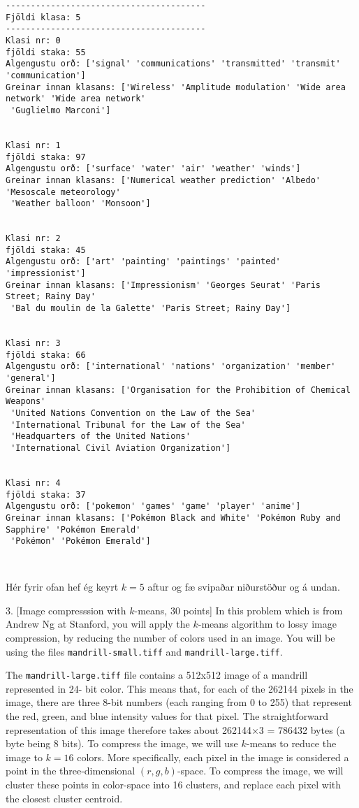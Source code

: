 \documentclass[11pt]{article}
\begin{document}
    \begin{Verbatim}[commandchars=\\\{\}]
----------------------------------------
Fjöldi klasa: 5
----------------------------------------
Klasi nr: 0
fjöldi staka: 55
Algengustu orð: ['signal' 'communications' 'transmitted' 'transmit' 'communication']
Greinar innan klasans: ['Wireless' 'Amplitude modulation' 'Wide area network' 'Wide area network'
 'Guglielmo Marconi']


Klasi nr: 1
fjöldi staka: 97
Algengustu orð: ['surface' 'water' 'air' 'weather' 'winds']
Greinar innan klasans: ['Numerical weather prediction' 'Albedo' 'Mesoscale meteorology'
 'Weather balloon' 'Monsoon']


Klasi nr: 2
fjöldi staka: 45
Algengustu orð: ['art' 'painting' 'paintings' 'painted' 'impressionist']
Greinar innan klasans: ['Impressionism' 'Georges Seurat' 'Paris Street; Rainy Day'
 'Bal du moulin de la Galette' 'Paris Street; Rainy Day']


Klasi nr: 3
fjöldi staka: 66
Algengustu orð: ['international' 'nations' 'organization' 'member' 'general']
Greinar innan klasans: ['Organisation for the Prohibition of Chemical Weapons'
 'United Nations Convention on the Law of the Sea'
 'International Tribunal for the Law of the Sea'
 'Headquarters of the United Nations'
 'International Civil Aviation Organization']


Klasi nr: 4
fjöldi staka: 37
Algengustu orð: ['pokemon' 'games' 'game' 'player' 'anime']
Greinar innan klasans: ['Pokémon Black and White' 'Pokémon Ruby and Sapphire' 'Pokémon Emerald'
 'Pokémon' 'Pokémon Emerald']



    \end{Verbatim}

    Hér fyrir ofan hef ég keyrt \(k=5\) aftur og fæ svipaðar niðurstöður og
á undan.

    3. {[}Image compresssion with \(k\)-means, 30 points{]} In this problem
which is from Andrew Ng at Stanford, you will apply the \(k\)-means
algorithm to lossy image compression, by reducing the number of colors
used in an image. You will be using the files
\texttt{mandrill-small.tiff} and \texttt{mandrill-large.tiff}.

The \texttt{mandrill-large.tiff} file contains a 512x512 image of a
mandrill represented in 24- bit color. This means that, for each of the
262144 pixels in the image, there are three 8-bit numbers (each ranging
from 0 to 255) that represent the red, green, and blue intensity values
for that pixel. The straightforward representation of this image
therefore takes about 262144×3 = 786432 bytes (a byte being 8 bits). To
compress the image, we will use \(k\)-means to reduce the image to
\(k = 16\) colors. More specifically, each pixel in the image is
considered a point in the three-dimensional \((r, g, b)\)-space. To
compress the image, we will cluster these points in color-space into 16
clusters, and replace each pixel with the closest cluster centroid.
\end{document}
